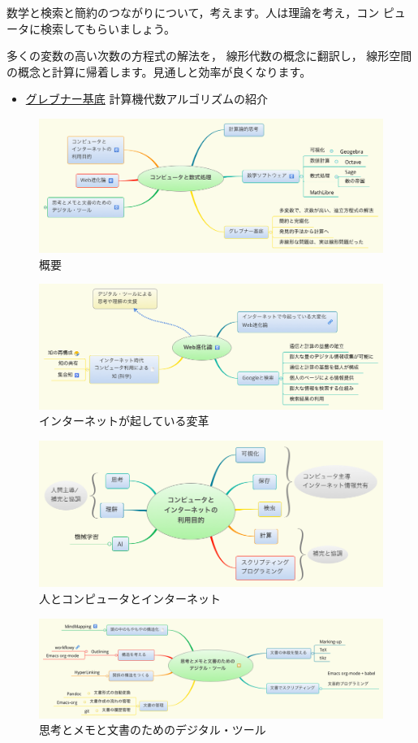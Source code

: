 \documentclass[dvipdfmx,11pat]{jarticle}
\begin{document}
数学と検索と簡約のつながりについて，考えます。人は理論を考え，コン
ピュータに検索してもらいましょう。

多くの変数の高い次数の方程式の解法を，
線形代数の概念に翻訳し，
線形空間の概念と計算に帰着します。見通しと効率が良くなります。

\begin{itemize}
\item \href{./org/groebner.org}{グレブナー基底} 計算機代数アルゴリズムの紹介
\end{itemize}

\begin{figure}[htbp]
\centering
\includegraphics[width=14cm]{./map-images/01-computer_and_cal.png}
\caption{概要}
\end{figure}

\begin{figure}[htbp]
\centering
\includegraphics[width=14cm]{./map-images/04-Web_revolution.png}
\caption{インターネットが起している変革}
\end{figure}

\begin{figure}[htbp]
\centering
\includegraphics[width=14cm]{./map-images/03-how_to_use_computer_and_internet.png}
\caption{人とコンピュータとインターネット}
\end{figure}

\begin{figure}[htbp]
\centering
\includegraphics[width=14cm]{./map-images/05-digital_tools_for_thinking.png}
\caption{思考とメモと文書のためのデジタル・ツール}
\end{figure}
\end{document}

